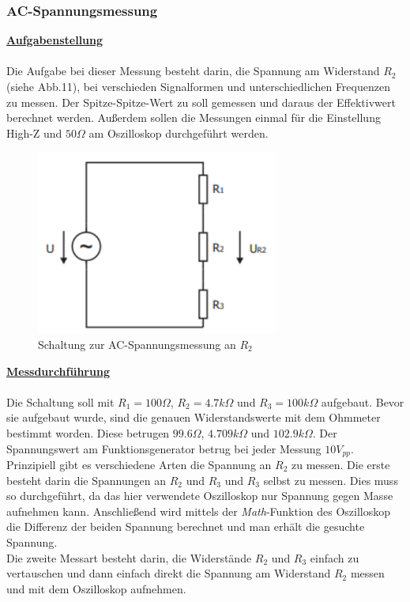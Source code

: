 \documentclass[a4paper,12pt]{article}
\begin{document}
	\subsubsection{AC-Spannungsmessung}
	\underline{\textbf{Aufgabenstellung}} \\ \\
	Die Aufgabe bei dieser Messung besteht darin, die Spannung am Widerstand $R_2$ (siehe Abb.11), bei verschieden Signalformen und unterschiedlichen Frequenzen zu messen. Der Spitze-Spitze-Wert zu soll gemessen und daraus der Effektivwert berechnet werden. Außerdem sollen die Messungen einmal für die Einstellung High-Z und $50\Omega$ am Oszilloskop durchgeführt werden.
	\begin{figure}[h]
		\centering
		\includegraphics[width=8cm]{img/AC-Spannungsmessung}
		\caption{Schaltung zur AC-Spannungsmessung an $R_2$}
	\end{figure}
	\newline
	\underline{\textbf{Messdurchführung}} \\ \\
	Die Schaltung soll mit $R_1 = 100\Omega$, $R_2 = 4.7k\Omega$ und $R_3 = 100k\Omega$ aufgebaut. Bevor sie aufgebaut wurde, sind die genauen Widerstandswerte mit dem Ohmmeter bestimmt worden. Diese betrugen $99.6\Omega$, $4.709k\Omega$ und $102.9k\Omega$. Der Spannungswert am Funktionsgenerator betrug bei jeder Messung $10V_{pp}$. \\
	\noindent
	Prinzipiell gibt es verschiedene Arten die Spannung an $R_2$ zu messen. Die erste besteht darin die Spannungen an $R_2$ und $R_3$ und $R_3$ selbst zu messen. Dies muss so durchgeführt, da das hier verwendete Oszilloskop nur Spannung gegen Masse aufnehmen kann. Anschließend wird mittels der \textit{Math}-Funktion des Oszilloskop die Differenz der beiden Spannung berechnet und man erhält die gesuchte Spannung. \\
	\noindent
	Die zweite Messart besteht darin, die Widerstände $R_2$ und $R_3$ einfach zu vertauschen und dann einfach direkt die Spannung am Widerstand $R_2$ messen und mit dem Oszilloskop aufnehmen.
\end{document}
